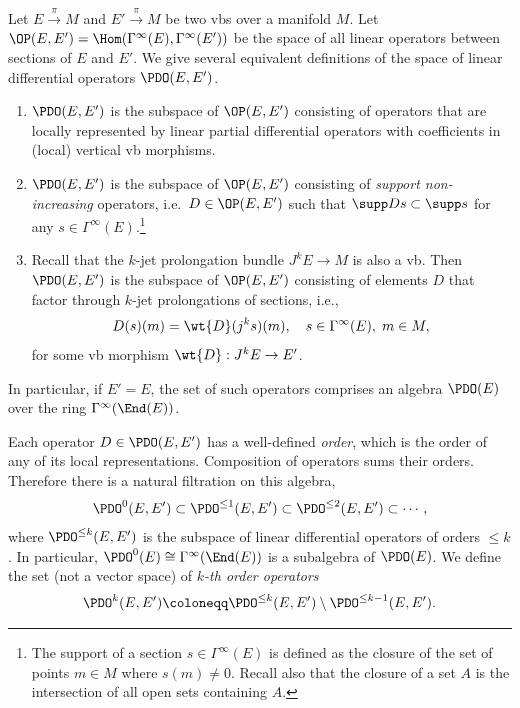 \begin{defn}
    Let $E\overset{\pi}{\to}M$ and $E'\overset{\pi}{\to}M$ be two \glspl{vb} over a manifold $M$. Let $\OP(E,E')=\Hom(\Gamma^\infty(E), \Gamma^\infty(E'))$ be the space of all linear operators between sections of $E$ and $E'$. We give several equivalent definitions of the space of linear differential operators $\PDO(E,E')$.
    \begin{enumerate}
        \item $\PDO(E,E')$ is the subspace of $\OP(E,E')$ consisting of operators that are locally represented by linear partial differential operators with coefficients in (local) vertical \gls{vb} morphisms.
        \item $\PDO(E,E')$ is the subspace of $\OP(E,E')$ consisting of \emph{support non-increasing} operators, i.e.\ $D\in\OP(E,E')$ such that $\supp Ds\subset \supp s$ for any $s\in\Gamma^\infty(E)$.\footnote{The support of a section $s\in\Gamma^\infty(E)$ is defined as the closure of the set of points $m\in M$ where $s(m)\neq 0$. Recall also that the closure of a set $A$ is the intersection of all open sets containing $A$.}
        \item Recall that the $k$-jet prolongation bundle $J^k E\to M$ is also a \gls{vb}. Then $\PDO(E,E')$ is the subspace of $\OP(E,E')$ consisting of elements $D$ that factor through $k$-jet prolongations of sections, i.e.,
        \[D(s)(m)=\wt{D}(j^ks)(m),\quad s\in \Gamma^\infty(E),\; m\in M,\]
        for some \gls{vb} morphism $\wt{D}:J^kE\to E'$.
    \end{enumerate}

    In particular, if $E'=E$, the set of such operators comprises an algebra $\PDO(E)$ over the ring $\Gamma^\infty(\End(E))$.
    
    Each operator $D\in\PDO(E,E')$ has a well-defined \emph{order}, which is the order of any of its local representations. Composition of operators sums their orders. Therefore there is a natural filtration on this algebra, 
    \[\PDO^0(E,E')\subset \PDO^{\leq 1}(E,E')\subset\PDO^{\leq 2}(E,E')\subset\cdots,\] 
    where $\PDO^{\leq k}(E,E')$ is the subspace of linear differential operators of orders $\leq k$. In particular, $\PDO^0(E)\cong \Gamma^\infty(\End(E))$ is a subalgebra of $\PDO(E)$. We define the set (not a vector space) of \emph{$k$-th order operators}
    \[\PDO^k(E,E')\coloneqq \PDO^{\leq k}(E,E')\setminus \PDO^{\leq k-1}(E,E').\]
\end{defn}

